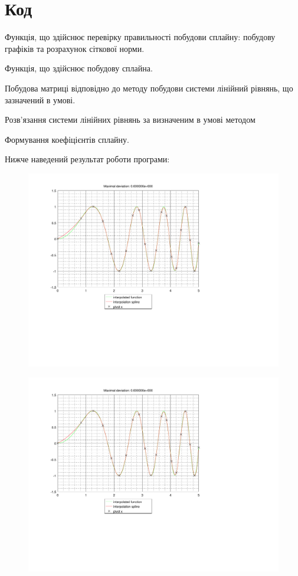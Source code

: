 \documentclass[titlepage]{article}
\newcommand\makelisting[1]{}
\begin{document}
\section{Код}
Функція, що здійснює перевірку правильності побудови сплайну: побудову графіків та розрахунок сіткової норми.
\makelisting{main.m}
Функція, що здійснює побудову сплайна.
\makelisting{CreateSpline.m}
Побудова матриці відповідно до методу побудови системи лінійний рівнянь, що зазначений в умові.
\makelisting{CreateMatrix.m}
Розв'язання системи лінійних рівнянь за визначеним в умові методом
\makelisting{Solve.m}
Формування коефіцієнтів сплайну.
\makelisting{FormSpline.m}
Нижче наведений результат роботи програми:
\begin{figure}[h]
\hspace{-3cm}\includegraphics[page=1]{../result.pdf}
\end{figure}
\begin{figure}[h]
\hspace{-3cm}\includegraphics[page=2]{../result.pdf}
\end{figure}
\end{document}
